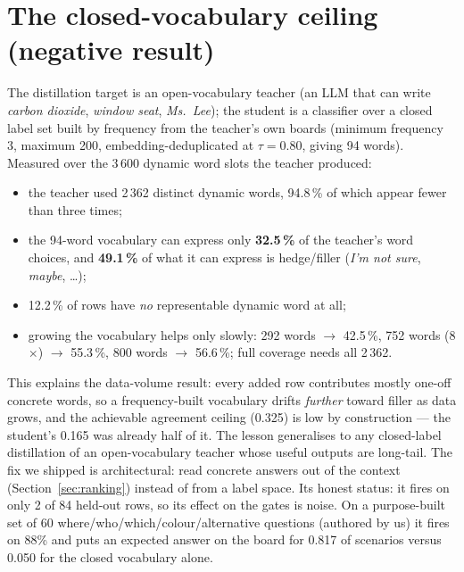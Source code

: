 \documentclass[11pt]{article}
\begin{document}
\section{The closed-vocabulary ceiling (negative result)}
\label{sec:ceiling}
The distillation target is an open-vocabulary teacher (an LLM that can write
\emph{carbon dioxide}, \emph{window seat}, \emph{Ms.~Lee}); the student is a
classifier over a closed label set built by frequency from the teacher's own
boards (minimum frequency 3, maximum 200, embedding-deduplicated at $\tau=0.80$,
giving 94 words). Measured over the 3\,600 dynamic word slots the teacher
produced:
\begin{itemize}
\item the teacher used 2\,362 distinct dynamic words, 94.8\,\% of which appear fewer than three times;
\item the 94-word vocabulary can express only \textbf{32.5\,\%} of the teacher's word choices, and \textbf{49.1\,\%} of what it can express is hedge/filler (\emph{I'm not sure}, \emph{maybe}, \ldots);
\item 12.2\,\% of rows have \emph{no} representable dynamic word at all;
\item growing the vocabulary helps only slowly: 292 words $\to$ 42.5\,\%, 752 words (8$\times$) $\to$ 55.3\,\%, 800 words $\to$ 56.6\,\%; full coverage needs all 2\,362.
\end{itemize}
This explains the data-volume result: every added row contributes mostly
one-off concrete words, so a frequency-built vocabulary drifts \emph{further}
toward filler as data grows, and the achievable agreement ceiling (0.325) is
low by construction --- the student's 0.165 was already half of it. The lesson
generalises to any closed-label distillation of an open-vocabulary teacher whose
useful outputs are long-tail. The fix we shipped is architectural: read concrete
answers out of the context (Section~\ref{sec:ranking}) instead of from a label
space. Its honest status: it fires on only 2 of 84 held-out rows, so its effect
on the gates is noise. On a purpose-built set of 60 where/who/which/colour/alternative
questions (authored by us) it fires on 88\% and puts an expected answer on the board
for 0.817 of scenarios versus 0.050 for the closed vocabulary alone.

\end{document}
